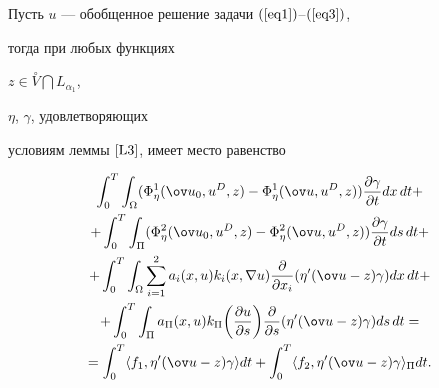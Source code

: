 \begin{lem}\label{L4}


Пусть $u$ --- обобщенное решение задачи $(\ref{eq1})$--$(\ref{eq3})$,


тогда при любых функциях


$z\in\overset{\circ}{V} \bigcap L_{\alpha_{1}}$,


$\eta$, $\gamma$, удовлетворяющих 


условиям леммы $\ref{L3}$, имеет место равенство


\begin{multline}  


\label{eq16} 


\int_{0}^{T} \int_{\Omega} ({ \Phi_{\eta}^{1} (\ov u_{0}, u^{D}, z) -


\Phi_{\eta}^{1} (\ov u, u^{D}, z)})


\frac{\partial \gamma}{\partial t} dx\, dt+ \\


%


+\int_{0}^{T} \int_{\Pi} ({ \Phi_{\eta}^{2} (\ov u_{0}, u^{D}, z) -


\Phi_{\eta}^{2} (\ov u, u^{D}, z)})


\frac{\partial \gamma}{\partial t} ds\, dt+ \\


%


+\int^{T}_{0} \int_{\Omega} \sum^{2}_{i=1} a_{i}(x,u)


k_{i}(x,\nabla u)


\frac{\partial}{\partial x_{i}}({\eta}' (\ov u-z)\gamma) dx\, dt+ \\


%


+\int^{T}_{0} \int_{\Pi} a_{\Pi}(x,u)


k_{\Pi}\bigg(\frac{\partial u}{\partial s}\bigg)


\frac{\partial}{\partial s} ({ \eta}' (\ov u-z) \gamma) ds\, dt= \\


%


=\int^{T}_{0} \langle f_{1},{\eta}' (\ov u-z) \gamma \rangle dt+


\int^{T}_{0} \langle f_{2},{\eta}' (\ov u-z) \gamma \rangle_{\Pi} dt .


\end{multline}  


\end{lem}





